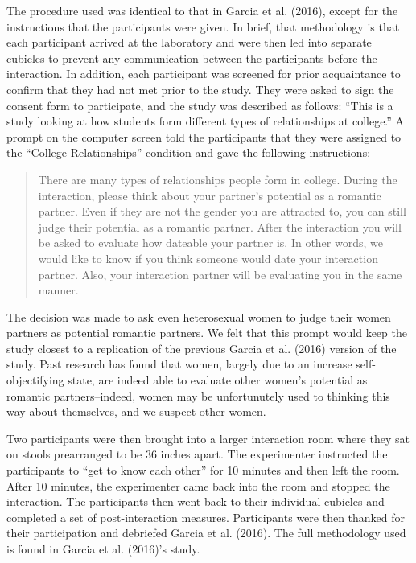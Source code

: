 \documentclass[man]{apa6}
\begin{document}
The procedure used was identical to that in Garcia et al. (2016), except
for the instructions that the participants were given. In brief, that
methodology is that each participant arrived at the laboratory and were
then led into separate cubicles to prevent any communication between the
participants before the interaction. In addition, each participant was
screened for prior acquaintance to confirm that they had not met prior
to the study. They were asked to sign the consent form to participate,
and the study was described as follows: \enquote{This is a study looking
at how students form different types of relationships at college.} A
prompt on the computer screen told the participants that they were
assigned to the \enquote{College Relationships} condition and gave the
following instructions:

\begin{quote}
There are many types of relationships people form in college. During the
interaction, please think about your partner's potential as a romantic
partner. Even if they are not the gender you are attracted to, you can
still judge their potential as a romantic partner. After the interaction
you will be asked to evaluate how dateable your partner is. In other
words, we would like to know if you think someone would date your
interaction partner. Also, your interaction partner will be evaluating
you in the same manner.
\end{quote}

The decision was made to ask even heterosexual women to judge their
women partners as potential romantic partners. We felt that this prompt
would keep the study closest to a replication of the previous Garcia et
al. (2016) version of the study. Past research has found that women,
largely due to an increase self-objectifying state, are indeed able to
evaluate other women's potential as romantic partners--indeed, women may
be unfortunutely used to thinking this way about themselves, and we
suspect other women.

Two participants were then brought into a larger interaction room where
they sat on stools prearranged to be 36 inches apart. The experimenter
instructed the participants to \enquote{get to know each other} for 10
minutes and then left the room. After 10 minutes, the experimenter came
back into the room and stopped the interaction. The participants then
went back to their individual cubicles and completed a set of
post-interaction measures. Participants were then thanked for their
participation and debriefed Garcia et al. (2016). The full methodology
used is found in Garcia et al. (2016)'s study.
\end{document}
